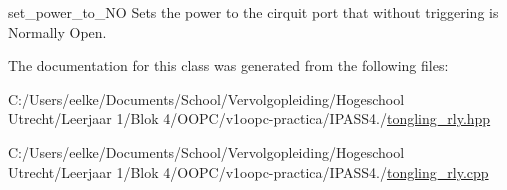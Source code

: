 set\+\_\+power\+\_\+to\+\_\+\+NO Sets the power to the cirquit port that without triggering is Normally Open. 



The documentation for this class was generated from the following files\+:\begin{DoxyCompactItemize}
\item 
C\+:/\+Users/eelke/\+Documents/\+School/\+Vervolgopleiding/\+Hogeschool Utrecht/\+Leerjaar 1/\+Blok 4/\+O\+O\+P\+C/v1oopc-\/practica/\+I\+P\+A\+S\+S4./\hyperlink{tongling__rly_8hpp}{tongling\+\_\+rly.\+hpp}\item 
C\+:/\+Users/eelke/\+Documents/\+School/\+Vervolgopleiding/\+Hogeschool Utrecht/\+Leerjaar 1/\+Blok 4/\+O\+O\+P\+C/v1oopc-\/practica/\+I\+P\+A\+S\+S4./\hyperlink{tongling__rly_8cpp}{tongling\+\_\+rly.\+cpp}\end{DoxyCompactItemize}
